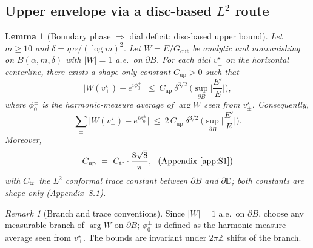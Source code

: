 \documentclass[11pt]{article}
\numberwithin{equation}{section}
\newtheorem{lemma}[theorem]{Lemma}
\theoremstyle{remark}
\newtheorem{remark}[theorem]{Remark}
\newcommand{\D}{\mathbb{D}}
\newcommand{\Gout}{G_{\mathrm{out}}}
\begin{document}
\subsection{Upper envelope via a disc-based $L^2$ route}\label{subsec:upper}

\begin{lemma}[Boundary phase $\Rightarrow$ dial deficit; disc-based upper bound]\label{lem:upper-disc}
Let $m\ge 10$ and $\delta=\eta\,\alpha/(\log m)^2$. Let $W=E/\Gout$ be analytic and nonvanishing on $B(\alpha,m,\delta)$ with $|W|=1$ a.e.\ on $\partial B$. For each dial $v_\pm^\star$ on the horizontal centerline, there exists a shape-only constant $C_{\mathrm{up}}>0$ such that
\begin{equation}\label{eq:upper-disc-point}
\big|W(v_\pm^\star)-e^{i\phi_0^\pm}\big|
\ \le\ C_{\mathrm{up}}\ \delta^{3/2}\ \Big(\sup_{\partial B}\Big|\frac{E'}{E}\Big|\Big),
\end{equation}
where $\phi_0^\pm$ is the harmonic-measure average of $\arg W$ seen from $v_\pm^\star$. Consequently,
\begin{equation}\label{eq:Uhm-upper-disc}
\sum_{\pm}\big|W(v_\pm^\star)-e^{i\phi_0^\pm}\big|
\ \le\ 2\,C_{\mathrm{up}}\ \delta^{3/2}\ \Big(\sup_{\partial B}\Big|\frac{E'}{E}\Big|\Big).
\end{equation}
Moreover,
\begin{equation}\label{eq:Cup-def}
C_{\mathrm{up}}\ =\ C_{\rm tr}\cdot \frac{8\sqrt{8}}{\pi},\ \ \text{(Appendix~\ref{app:S1})} %
\end{equation}
with $C_{\rm tr}$ the $L^2$ conformal trace constant between $\partial B$ and $\partial\D$; both constants are \emph{shape-only} (Appendix~S.1).
\end{lemma}

\begin{remark}[Branch and trace conventions]
Since $|W|=1$ a.e.\ on $\partial B$, choose any measurable branch of $\arg W$ on $\partial B$; $\phi_0^\pm$ is defined as the harmonic-measure average seen from $v_\pm^\star$. The bounds are invariant under $2\pi\mathbb Z$ shifts of the branch.
\end{remark}
\end{document}

